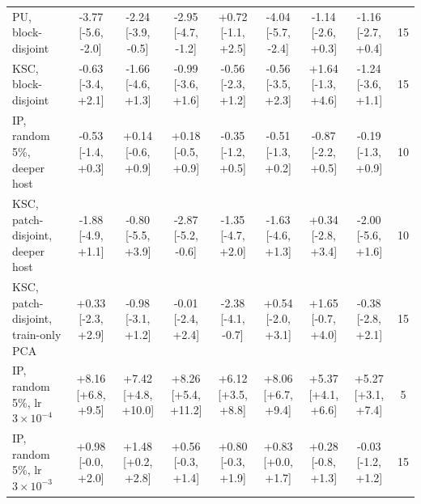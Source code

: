 \begin{tabular}{lcccccccc}
PU, block-disjoint & -3.77 [-5.6, -2.0] & -2.24 [-3.9, -0.5] & -2.95 [-4.7, -1.2] & +0.72 [-1.1, +2.5] & -4.04 [-5.7, -2.4] & -1.14 [-2.6, +0.3] & -1.16 [-2.7, +0.4] & 15 \\
KSC, block-disjoint & -0.63 [-3.4, +2.1] & -1.66 [-4.6, +1.3] & -0.99 [-3.6, +1.6] & -0.56 [-2.3, +1.2] & -0.56 [-3.5, +2.3] & +1.64 [-1.3, +4.6] & -1.24 [-3.6, +1.1] & 15 \\
\midrule
IP, random 5\%, deeper host & -0.53 [-1.4, +0.3] & +0.14 [-0.6, +0.9] & +0.18 [-0.5, +0.9] & -0.35 [-1.2, +0.5] & -0.51 [-1.3, +0.2] & -0.87 [-2.2, +0.5] & -0.19 [-1.3, +0.9] & 10 \\
KSC, patch-disjoint, deeper host & -1.88 [-4.9, +1.1] & -0.80 [-5.5, +3.9] & -2.87 [-5.2, -0.6] & -1.35 [-4.7, +2.0] & -1.63 [-4.6, +1.3] & +0.34 [-2.8, +3.4] & -2.00 [-5.6, +1.6] & 10 \\
KSC, patch-disjoint, train-only PCA & +0.33 [-2.3, +2.9] & -0.98 [-3.1, +1.2] & -0.01 [-2.4, +2.4] & -2.38 [-4.1, -0.7] & +0.54 [-2.0, +3.1] & +1.65 [-0.7, +4.0] & -0.38 [-2.8, +2.1] & 15 \\
IP, random 5\%, lr $3\times10^{-4}$ & +8.16 [+6.8, +9.5] & +7.42 [+4.8, +10.0] & +8.26 [+5.4, +11.2] & +6.12 [+3.5, +8.8] & +8.06 [+6.7, +9.4] & +5.37 [+4.1, +6.6] & +5.27 [+3.1, +7.4] & 5 \\
IP, random 5\%, lr $3\times10^{-3}$ & +0.98 [-0.0, +2.0] & +1.48 [+0.2, +2.8] & +0.56 [-0.3, +1.4] & +0.80 [-0.3, +1.9] & +0.83 [+0.0, +1.7] & +0.28 [-0.8, +1.3] & -0.03 [-1.2, +1.2] & 15 \\
\bottomrule
\end{tabular}

